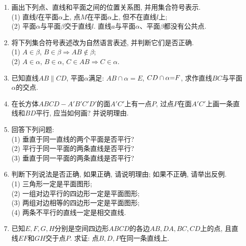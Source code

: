 \documentclass[10pt,a4paper]{article}
\begin{document}
\begin{enumerate}[1.]
\item 画出下列点、直线和平面之间的位置关系图, 并用集合符号表示.\\
(1) 直线$l$在平面$\alpha$上, 点$M$在平面$\alpha$上, 但不在直线$l$上;\\
(2) 平面$\alpha$与平面$\beta$交于直线$l$. 直线$a$与平面$\alpha$、平面$\beta$都没有公共点.
\item 将下列集合符号表述改为自然语言表述, 并判断它们是否正确.\\
(1) $A\in \beta$, $B\in \beta \Rightarrow AB\not\in \beta$;\\
(2) $A\in \alpha$, $B\in \alpha$, $C\in AB\Rightarrow C\in \alpha$.
\item 已知直线$AB\parallel CD$, 平面$\alpha$满足: $AB\cap \alpha =E$, $CD\cap \alpha \text=F$, 求作直线$BC$与平面$\alpha$的交点.
\item 在长方体$ABCD-A'B'C'D'$的面$A'C'$上有一点$P$, 过点$P$在面$A'C'$上画一条直线和$BD$平行, 应当如何画? 并说明理由.
\begin{center}
\end{center}
\item 回答下列问题:\\
(1) 垂直于同一直线的两个平面是否平行?\\
(2) 平行于同一平面的两条直线是否平行?\\
(3) 垂直于同一平面的两条直线是否平行?
\item 判断下列说法是否正确, 如果正确, 请说明理由; 如果不正确, 请举出反例.\\
(1) 三角形一定是平面图形;\\
(2) 一组对边平行的四边形一定是平面图形;\\
(3) 两组对边相等的四边形一定是平面图形;\\
(4) 两条不平行的直线一定是相交直线.
\item 已知$E,F,G,H$分别是空间四边形$ABCD$的各边$AB,DA,BC,CD$上的点, 且直线$EF$和$GH$交于点$P$. 求证: 点$B,D,P$在同一条直线上.

\end{enumerate}
\end{document}
